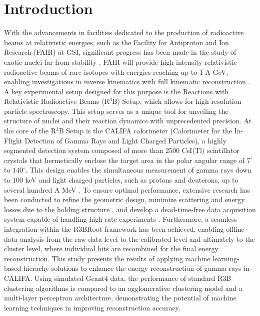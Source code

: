 \documentclass[final,5p,times,twocolumn]{elsarticle}
\begin{document}
\section{Introduction}
\label{sec:intro}
With the advancements in facilities dedicated to the production of radioactive beams at relativistic energies, such as the Facility for Antiproton and Ion Research (FAIR) at GSI, significant progress has been made in the study of exotic nuclei far from stability \cite{kalantar2024experiments}. FAIR will provide high-intensity relativistic radioactive beams of rare isotopes with energies reaching up to 1 A GeV, enabling investigations in inverse kinematics with full kinematic reconstruction \cite{leifels2025status}.
A key experimental setup designed for this purpose is the Reactions with Relativistic Radioactive Beams (R$^3$B) Setup, which allows for high-resolution particle spectroscopy. This setup serves as a unique tool for unveiling the structure of nuclei and their reaction dynamics with unprecedented precision.\newline
At the core of the R$^3$B Setup is the CALIFA calorimeter (Calorimeter for the In-Flight Detection of Gamma Rays and Light Charged Particles), a highly segmented detection system composed of more than 2500 CsI(Tl) scintillator crystals that hermetically enclose the target area in the polar angular range of $7^\circ$ to $140^\circ$. This design enables the simultaneous measurement of gamma rays down to 100 keV and light charged particles, such as protons and deuterons, up to several hundred A MeV \cite{cortina2014califa}. To ensure optimal performance, extensive research has been conducted to refine the geometric design, minimize scattering and energy losses due to the holding structure \cite{alvarez2014performance}, and develop a dead-time-free data acquisition system capable of handling high-rate experiments \cite{ledigital}. Furthermore, a seamless integration within the R3BRoot framework \cite{bertini2011r3broot} has been achieved, enabling offline data analysis from the raw data level to the calibrated level and ultimately to the cluster level, where individual hits are recombined for the final energy reconstruction.\newline
This study presents the results of applying machine learning-based hierachy solutions to enhance the energy reconstruction of gamma rays in CALIFA. Using simulated Geant4 data, the performance of standard R3B clustering algorithms is compared to an agglomerative clustering model \cite{Nielsen2016} and a multi-layer perceptron architecture, demonstrating the potential of machine learning techniques in improving reconstruction accuracy.\newline
\end{document}
